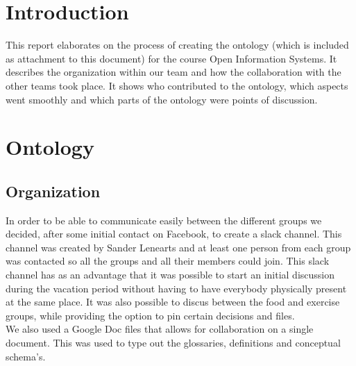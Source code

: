 

\maketitlepage


\section{Introduction}
This report elaborates on the process of creating the ontology (which is included as attachment to this document) for the course Open Information Systems. It describes the organization within our team and how the collaboration with the other teams took place. It shows who contributed to the ontology, which aspects went smoothly and which parts of the ontology were points of discussion.  





\section{Ontology}

\subsection{Organization}

In order to be able to communicate easily between the different groups we decided, after some initial contact on Facebook, to create a slack channel. This channel was created by Sander Lenearts and at least one person from each group was contacted so all the groups and all their members could join. This slack channel has as an advantage that it was possible to start an initial discussion during the vacation period without having to have everybody physically present at the same place. It was also possible to discus between the food and exercise groups, while providing the option to pin certain decisions and files.\\
We also used a Google Doc files that allows for collaboration on a single document. This was used to type out the glossaries, definitions and conceptual schema's.

